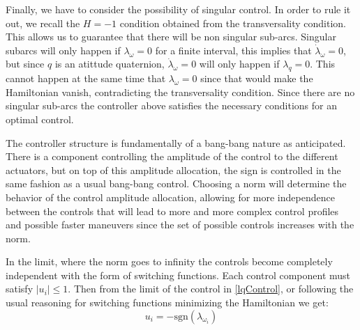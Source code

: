 Finally, we have to consider the possibility of singular control. In order to rule it out, we recall the $H=-1$ condition obtained from the transversality condition. This allows us to guarantee that there will be non singular sub-arcs. Singular subarcs will only happen if $\lambda_\omega = 0$ for a finite interval, this implies that $\dot{\lambda}_\omega = 0$, but since $q$ is an atittude quaternion, $\dot{\lambda}_\omega = 0$ will only happen if $\lambda_q=0$. This cannot happen at the same time that $\lambda_\omega = 0$ since that would make the Hamiltonian vanish, contradicting the transversality condition. Since there are no singular sub-arcs the controller above satisfies the necessary conditions for an optimal control. 

The controller structure is fundamentally of a bang-bang nature as anticipated. There is a component controlling the amplitude of the control to the different actuators, but on top of this amplitude allocation, the sign is controlled in the same fashion as a usual bang-bang control. Choosing a norm will determine the behavior of the control amplitude allocation, allowing for more independence between the controls that will lead to more and more complex control profiles and possible faster maneuvers since the set of possible controls increases with the norm. 

In the limit, where the norm goes to infinity the controls become completely independent with the form of switching functions. Each control component must satisfy $|u_i|\leq 1$. Then from the limit of the control in \ref{lqControl}, or following the usual reasoning for switching functions minimizing the Hamiltonian we get:
\begin{equation}
\label{lInfinityControl}
u_i = -\text{sgn}(\lambda_{\omega_{i}})
\end{equation}